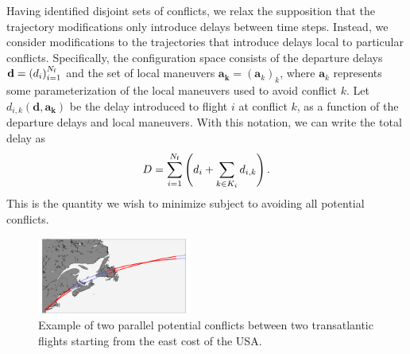 Having identified disjoint sets of conflicts, we relax the supposition that the trajectory modifications only introduce delays between time steps.
Instead, we consider modifications to the trajectories that introduce delays local to particular conflicts.
Specifically, the configuration space consists of the departure delays $\mathbf d = {\left(d_i\right)}_{i=1}^{N_{\mathrm{f}}}$ and the set of local maneuvers $\mathbf a_{\mathbf k} = {\left(\mathbf a_k\right)}_k$, where $\mathbf a_k$ represents some parameterization of the local maneuvers used to avoid conflict $k$.
Let $d_{i, k} (\mathbf d, \mathbf a_{\mathbf k})$ be the delay introduced to flight $i$ at conflict $k$, as a function of the departure delays and local maneuvers.
With this notation, we can write the total delay as
\begin{equation}
D = 
\sum_{i = 1}^{N_{\mathrm{f}}}
\left(d_i + \sum_{k \in K_i} d_{i, k}\right).
\end{equation}
This is the quantity we wish to minimize subject to avoiding all potential conflicts.
\begin{figure}[htpb]
    \begin{center}
        \includegraphics[width=0.45\textwidth]{./pics/example_conflict_in_real_space.pdf}
    \end{center}
    \caption[Conflict example]{Example of two parallel potential conflicts between two transatlantic flights starting from the east cost of the USA.}
\label{fig:example_parallel_conflict}
\end{figure}


